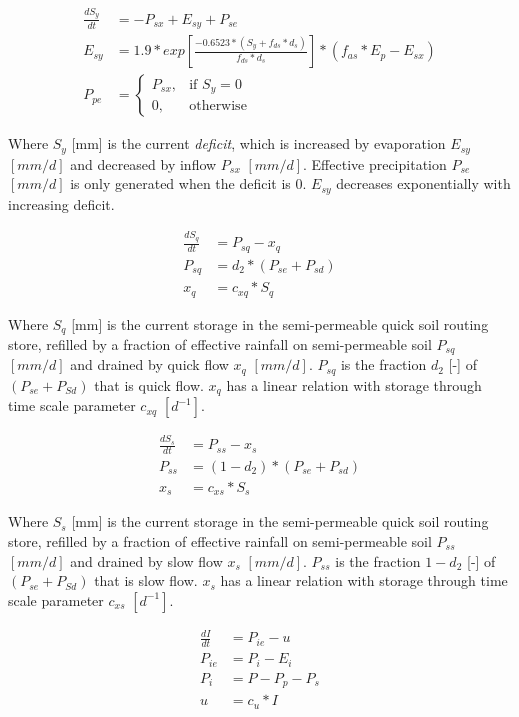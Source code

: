 \begin{align}
	\frac{dS_y}{dt} &= -P_{sx}+E_{sy}+P_{se} \\
	E_{sy} &= 1.9*exp\left[{\frac{-0.6523*(S_y+f_{ds}*d_s)}{f_{ds}*d_s}}\right]*\left(f_{as}*E_p - E_{sx}\right)\\
	P_{pe} &= 
	\begin{cases}
		P_{sx}, & \text{if } S_y = 0 \\
		0, & \text{otherwise}
	\end{cases}
\end{align}

Where $S_y$ [mm] is the current \emph{deficit}, which is increased by evaporation $E_{sy}$ $[mm/d]$ and decreased by inflow $P_{sx}$ $[mm/d]$.
Effective precipitation $P_{se}$ $[mm/d]$ is only generated when the deficit is 0.
$E_{sy}$ decreases exponentially with increasing deficit.

\begin{align}
	\frac{dS_q}{dt} &= P_{sq}-x_q \\
	P_{sq} &= d_2*(P_{se}+P_{sd})\\	
	x_q &= c_{xq}*S_q
\end{align}

Where $S_q$ [mm] is the current storage in the semi-permeable quick soil routing store, refilled by a fraction of effective rainfall on semi-permeable soil $P_{sq}$ $[mm/d]$ and drained by quick flow $x_q$ $[mm/d]$.
$P_{sq}$ is the fraction $d_2$ [-] of $(P_{se}+P_{Sd})$ that is quick flow.
$x_q$ has a linear relation with storage through time scale parameter $c_{xq}$ $[d^{-1}]$.

\begin{align}
	\frac{dS_s}{dt} &= P_{ss}-x_s \\
	P_{ss} &= (1-d_2)*(P_{se}+P_{sd})\\	
	x_s &= c_{xs}*S_s
\end{align}

Where $S_s$ [mm] is the current storage in the semi-permeable quick soil routing store, refilled by a fraction of effective rainfall on semi-permeable soil $P_{ss}$ $[mm/d]$ and drained by slow flow $x_s$ $[mm/d]$.
$P_{ss}$ is the fraction $1-d_2$ [-] of $(P_{se}+P_{Sd})$ that is slow flow.
$x_s$ has a linear relation with storage through time scale parameter $c_{xs}$ $[d^{-1}]$.


\begin{align}
	\frac{dI}{dt} &= P_{ie}-u \\
	P_{ie} &= P_i-E_i\\
	P_i &= P-P_p-P_s\\
	u &= c_{u}*I
\end{align}

